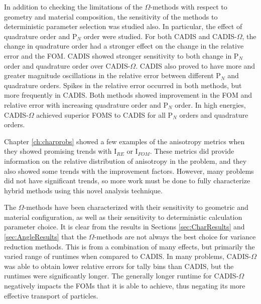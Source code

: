 In addition to checking the limitations of the $\Omega$-methods with respect to
geometry and material composition, the sensitivity of the methods to
deterministic parameter selection was studied also. In particular, the effect of
quadrature order and P$_N$ order were studied. For both CADIS and
CADIS-$\Omega$, the change in quadrature order had a stronger effect on the
change in the relative error and the FOM. CADIS showed stronger sensitivity to
both change in P$_N$ order and quadrature order over CADIS-$\Omega$. CADIS also
proved to have more and greater magnitude oscillations in the relative error
between different P$_N$ and quadrature orders. Spikes in the relative error
occurred in both methods, but more frequently in CADIS. Both
methods showed improvement in the FOM and relative error with increasing
quadrature order and P$_N$ order.
In high energies, CADIS-$\Omega$ achieved superior FOMS to CADIS for all P$_N$
orders and quadrature orders.

Chapter \ref{ch:charprobs} showed a few examples of the anisotropy metrics when
they showed promising trends with I$_{RE}$ or I$_{FOM}$. These metrics did
provide information on the relative distribution of anisotropy in the problem,
and they also showed some trends with the improvement factors. However, many
problems did not have significant trends, so more work must be done to fully
characterize hybrid methods using this novel analysis technique.

The $\Omega$-methods have been characterized with their sensitivity to
geometric and material configuration, as well as their sensitivity to
deterministic calculation parameter choice. It is clear from the results in
Sections \ref{sec:CharResults} and \ref{sec:AngleResults} that the
$\Omega$-methods are not always the best choice for variance reduction methods.
This is from a combination of many effects, but primarily the varied range of
runtimes when compared to CADIS. In many problems, CADIS-$\Omega$ was able to
obtain lower relative errors for tally bins than CADIS, but the runtimes were
significantly longer. The generally longer runtime for CADIS-$\Omega$
negatively impacts the FOMs that it is able to achieve, thus negating its more
effective transport of particles.
